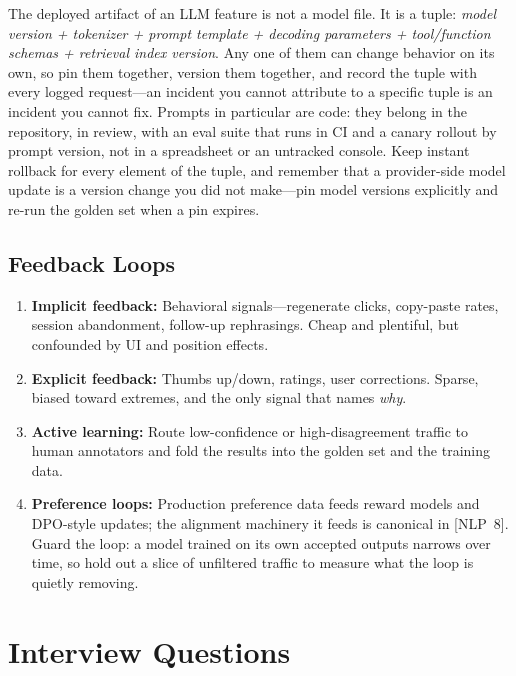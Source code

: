 The deployed artifact of an LLM feature is not a model file.  It is a tuple:
\emph{model version + tokenizer + prompt template + decoding parameters +
tool/function schemas + retrieval index version}.  Any one of them can change
behavior on its own, so pin them together, version them together, and record
the tuple with every logged request---an incident you cannot attribute to a
specific tuple is an incident you cannot fix.  Prompts in particular are
code: they belong in the repository, in review, with an eval suite that runs
in CI and a canary rollout by prompt version, not in a spreadsheet or an
untracked console.  Keep instant rollback for every element of the tuple, and
remember that a provider-side model update is a version change you did not
make---pin model versions explicitly and re-run the golden set when a pin
expires.

\subsection{Feedback Loops}

\begin{enumerate}
    \item \textbf{Implicit feedback:}  Behavioral signals---regenerate clicks,
          copy-paste rates, session abandonment, follow-up rephrasings.  Cheap
          and plentiful, but confounded by UI and position effects.
    \item \textbf{Explicit feedback:}  Thumbs up/down, ratings, user
          corrections.  Sparse, biased toward extremes, and the only signal
          that names \emph{why}.
    \item \textbf{Active learning:}  Route low-confidence or
          high-disagreement traffic to human annotators and fold the results
          into the golden set and the training data.
    \item \textbf{Preference loops:}  Production preference data feeds reward
          models and DPO-style updates; the alignment machinery it feeds is
          canonical in [NLP~8].  Guard the loop: a model trained on its own
          accepted outputs narrows over time, so hold out a slice of
          unfiltered traffic to measure what the loop is quietly removing.
\end{enumerate}


\section{Interview Questions}
\label{sec:production_interview_questions}


